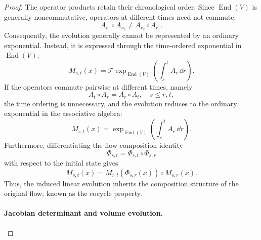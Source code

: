 \documentclass[12pt,a4paper,oneside]{book}
\begin{document}
\begin{proof}
The operator products retain their chronological order. Since $\operatorname{End}(V)$ is generally noncommutative, operators
at different times need not commute:
\begin{equation*}
    A_{r_1}\circ A_{r_2} \neq A_{r_2}\circ A_{r_1}.
\end{equation*}
Consequently, the evolution generally cannot be represented by an ordinary exponential. Instead, it is expressed through
the time-ordered exponential in $\operatorname{End}(V)$:
\begin{equation*}
    M_{s,t}(x) = \mathcal T\exp_{\operatorname{End}(V)}
        \left(
            \int_s^t A_r\,\dd r
        \right).
\end{equation*}
If the operators commute pairwise at different times, namely
\begin{equation*}
    A_t\circ A_r=A_r\circ A_t, \quad s\leq r,t,
\end{equation*}
the time ordering is unnecessary, and the evolution reduces to the ordinary exponential in the associative algebra:
\begin{equation*}
    M_{s,t}(x) = \exp_{\operatorname{End}(V)}
        \left(
            \int_s^t A_r\,\dd r
        \right).
\end{equation*}
Furthermore, differentiating the flow composition identity
\begin{equation*}
    \Phi_{s,t}=\Phi_{r,t}\circ\Phi_{s,r}
\end{equation*}
with respect to the initial state gives
\begin{equation*}
    M_{s,t}(x) = M_{r,t}(\Phi_{s,r}(x))\circ M_{s,r}(x).
\end{equation*}
Thus, the induced linear evolution inherits the composition structure of the original flow, known as the cocycle property.

\paragraph{Jacobian determinant and volume evolution.}


\end{proof}
\end{document}
